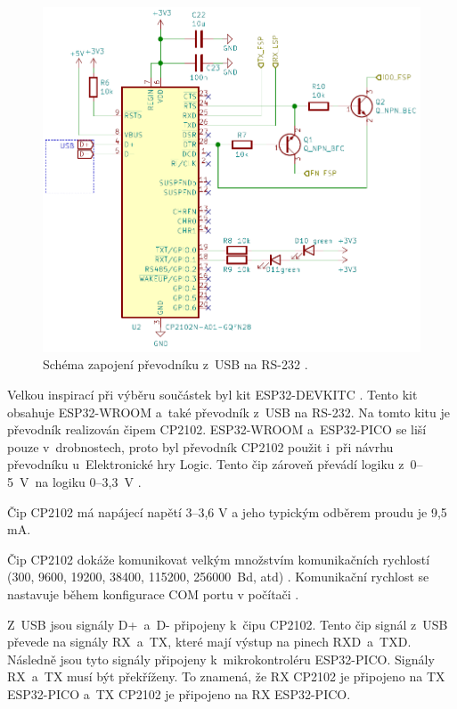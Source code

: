   \begin{figure}[!h]
    \begin{center}
      \includegraphics[scale=0.55]{obrazky/CP2102_schema.png}
    \end{center}
    \caption[Schéma zapojení převodníku z~USB na RS-232 \cite{Devkit_schema}]{Schéma zapojení převodníku z~USB na RS-232 \cite{Devkit_schema}.}
  \end{figure}

  Velkou inspirací při výběru součástek byl kit ESP32-DEVKITC \cite{Devkit_schema}. Tento kit obsahuje ESP32-WROOM a~také převodník
  z~USB na RS-232. Na tomto kitu je převodník realizován čipem CP2102. ESP32-WROOM a~ESP32-PICO se liší pouze v~drobnostech, 
  proto byl převodník CP2102 použit i~při návrhu převodníku u~Elektronické hry Logic.  Tento čip zároveň převádí logiku 
  z~0--5~V~na logiku 0--3,3~V \cite{CP2102_datasheet}. 

 Čip CP2102 má napájecí napětí 3--3,6 V a jeho typickým odběrem proudu je 9,5 mA.

  Čip CP2102 dokáže komunikovat velkým množstvím komunikačních rychlostí (300, 9600, 19200, 38400, 115200, 256000~Bd, atd) 
  \cite{CP2102_datasheet}. Komunikační rychlost se nastavuje během konfigurace COM portu v počítači \cite{CP2102_datasheet}.

  Z~USB jsou signály D+~a~D- připojeny k~čipu CP2102. Tento čip signál z~USB převede na signály RX~a~TX, které mají výstup 
  na pinech RXD~a~TXD. Následně jsou tyto signály připojeny k~mikrokontroléru ESP32-PICO. Signály RX~a~TX musí být překříženy. To znamená, že RX CP2102
  je připojeno na TX ESP32-PICO a~TX CP2102 je připojeno na RX ESP32-PICO. 

